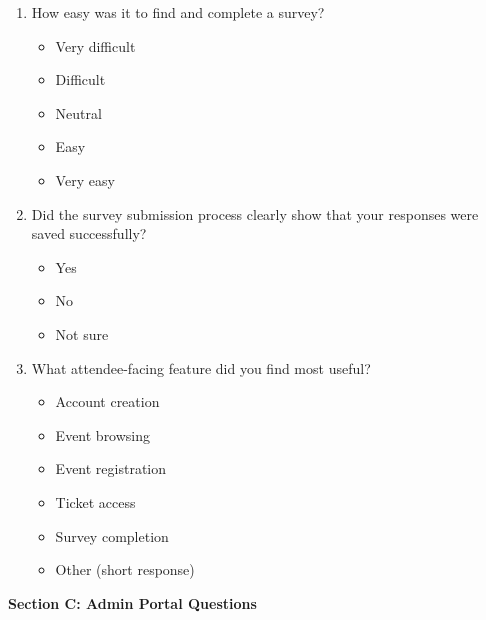 \documentclass[12pt]{article}
\begin{document}
\begin{enumerate}
\begin{itemize}[label=$\circ$]
        \item Difficult
        \item Neutral
        \item Easy
        \item Very easy
    \end{itemize}
    \item How easy was it to find and complete a survey?
    \begin{itemize}[label=$\circ$]
        \item Very difficult
        \item Difficult
        \item Neutral
        \item Easy
        \item Very easy
    \end{itemize}
    \item Did the survey submission process clearly show that your responses were saved successfully?
    \begin{itemize}[label=$\circ$]
        \item Yes
        \item No
        \item Not sure
    \end{itemize}
    \item What attendee-facing feature did you find most useful?
    \begin{itemize}[label=$\circ$]
        \item Account creation
        \item Event browsing
        \item Event registration
        \item Ticket access
        \item Survey completion
        \item Other (short response)
    \end{itemize}
\end{enumerate}
\textbf{Section C: Admin Portal Questions}
\end{document}
